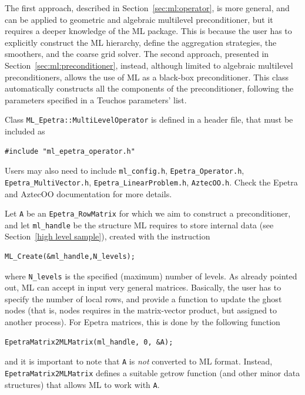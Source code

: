The first approach, described in Section~\ref{sec:ml:operator}, is more
general, and can be applied to geometric and algebraic multilevel
preconditioner, but it requires a deeper knowledge of the ML package.
This is because the user has to explicitly construct the ML hierarchy,
define the aggregation strategies, the smoothers, and the coarse grid
solver. The second approach, presented in
Section~\ref{sec:ml:preconditioner}, instead, although limited to algebraic
multilevel preconditioners, allows the use of ML as a black-box
preconditioner. This class automatically constructs all the components
of the preconditioner, following the parameters specified in a Teuchos
parameters' list. 

\bigskip

Class \verb!ML_Epetra::MultiLevelOperator! is defined in a header file, that must
be included as
\begin{verbatim}
#include "ml_epetra_operator.h" 
\end{verbatim}
Users may also need to include \verb!ml_config.h!,
\verb!Epetra_Operator.h!, \verb!Epetra_MultiVector.h!,
\verb!Epetra_LinearProblem.h!,  \verb!AztecOO.h!. Check the Epetra and
AztecOO documentation for more details.

Let \verb!A! be an \verb!Epetra_RowMatrix! for which we aim to construct
a preconditioner, and let \verb!ml_handle! be the structure ML requires
to store internal data (see Section~\ref{high level sample}), created
with the instruction
\begin{verbatim}
ML_Create(&ml_handle,N_levels);
\end{verbatim}
where \verb!N_levels! is the specified (maximum) number of levels.  As
already pointed out, ML can accept in input very general matrices.
Basically, the user has to specify the number of local rows, and provide
a function to update the ghost nodes (that is, nodes requires in the
matrix-vector product, but assigned to another process). For Epetra
matrices, this is done by the following function
\begin{verbatim}
EpetraMatrix2MLMatrix(ml_handle, 0, &A);
\end{verbatim}
and it is important to note that \verb!A! is {\sl not} converted to ML
format. Instead, \verb!EpetraMatrix2MLMatrix! defines a suitable getrow
function (and other minor data structures) that allows ML to work with
\verb!A!.

